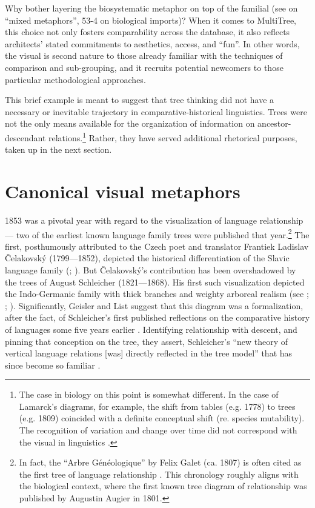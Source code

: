 \documentclass[output=paper]{langscibook}
\begin{document}
Why bother layering the biosystematic metaphor on top of the familial (see \citealt[49]{Wells1987} on ``mixed metaphors'', 53-4 on biological imports)? When it comes to MultiTree, this choice not only fosters comparability across the database, it also reflects architects' stated commitments to aesthetics, access, and ``fun''. In other words, the visual is second nature to those already familiar with the techniques of comparison and sub-grouping, and it recruits potential newcomers to those particular methodological approaches.

This brief example is meant to suggest that tree thinking did not have a necessary or inevitable trajectory in comparative-historical linguistics. Trees were not the only means available for the organization of information on ancestor-descendant relations.\footnote{The case in biology on this point is somewhat different. In the case of Lamarck's diagrams, for example, the shift from tables (e.g. 1778) to trees (e.g. 1809) coincided with a definite conceptual shift (re. species mutability). The recognition of variation and change over time did not correspond with the visual in linguistics \citep[ch. 3]{Archibald2014}.} Rather, they have served additional rhetorical purposes, taken up in the next section.

\section{Canonical visual metaphors}
\label{sec:kaplan:visualmetaphors}

1853 was a pivotal year with regard to the visualization of language relationship — two of the earliest known language family trees were published that year.\footnote{In fact, the ``Arbre Généologique'' by Felix Galet (ca. 1807) is often cited as the first tree of language relationship \citep[242]{Hellstrom2012}. This chronology roughly aligns with the biological context, where the first known tree diagram of relationship was published by Augustin Augier in 1801.} The first, posthumously attributed to the Czech poet and translator Frantiek Ladislav Čelakovský (1799—1852), depicted the historical differentiation of the Slavic language family (\citealt[3]{Czelakovsky1853}; \citealt{Priestly1975}). But Čelakovský's contribution has been overshadowed by the trees of August Schleicher (1821—1868). His first such visualization depicted the Indo-Germanic family with thick branches and weighty arboreal realism (see \citealt{Maher1966}; \citealt{Hoenigswald1975}; \citealt{Koerner1987}). Significantly, Geisler and List suggest that this diagram was a formalization, after the fact, of Schleicher's first published reflections on the comparative history of languages some five years earlier \citep{Schleicher1848}. Identifying relationship with descent, and pinning that conception on the tree, they assert, Schleicher's ``new theory of vertical language relations [was] directly reflected in the tree model'' that has since become so familiar \citep[114]{GeislerList2013}.
\end{document}
